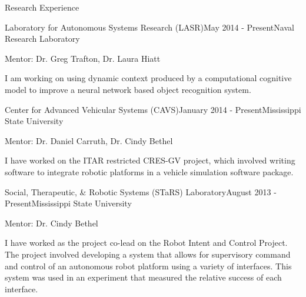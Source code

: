 \documentclass{resume} %
\begin{document}
\begin{rSection}{Research Experience}

	\begin{rSubsection}{Laboratory for Autonomous Systems Research (LASR)}{May 2014 - Present}{Naval Research Laboratory}{}
	\item Mentor: Dr. Greg Trafton, Dr. Laura Hiatt
	\item I am working on using dynamic context produced by a computational cognitive model to improve a neural network based object recognition system.  
	\end{rSubsection}


	\begin{rSubsection}{Center for Advanced Vehicular Systems (CAVS)}{January 2014 - Present}{Mississippi State University}{}
	\item Mentor: Dr. Daniel Carruth, Dr. Cindy Bethel
	\item I have worked on the ITAR restricted CRES-GV project, which involved writing software to integrate robotic platforms in a vehicle simulation software package.
	\end{rSubsection}


	\begin{rSubsection}{Social, Therapeutic, \& Robotic Systems (STaRS) Laboratory}{August 2013 - Present}{Mississippi State University}{}
	\item Mentor: Dr. Cindy Bethel
	\item I have worked as the project co-lead on the Robot Intent and Control Project.  The project involved developing a system that allows for supervisory command and control of an autonomous robot platform using a variety of interfaces.  This system was used in an experiment that measured the relative success of each interface.
	\end{rSubsection}




\end{rSection}


\end{document}
